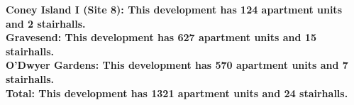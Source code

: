 \bf{Coney Island I (Site 8)}: This development has 124 apartment units and 2 stairhalls.\\\bf{Gravesend}: This development has 627 apartment units and 15 stairhalls.\\\bf{O'Dwyer Gardens}: This development has 570 apartment units and 7 stairhalls.\\\bf{Total}: This development has 1321 apartment units and 24 stairhalls.\\